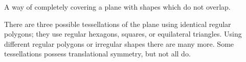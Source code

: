 A way of completely covering a plane with shapes which do not
overlap.
\par
There are three possible tessellations of the plane using
identical regular polygons; they use regular hexagons, squares, or
equilateral triangles. Using different regular polygons or
irregular shapes there are many more. Some tessellations possess
translational symmetry, but not all do.